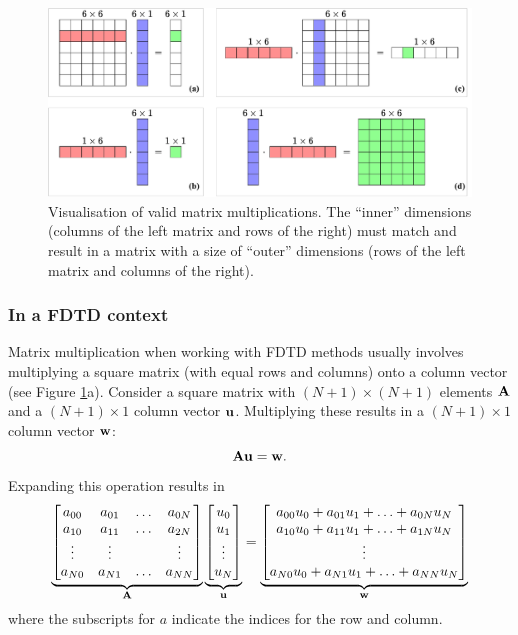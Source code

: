 \begin{figure}[h]
    \includegraphics[width=\textwidth]{figures/analysis/matrixVector.pdf}
    \caption{Visualisation of valid matrix multiplications. The ``inner'' dimensions (columns of the left matrix and rows of the right) must match and result in a matrix with a size of ``outer'' dimensions (rows of the left matrix and columns of the right). \label{fig:matrixVector}}
\end{figure}

\subsubsection{In a FDTD context}
Matrix multiplication when working with FDTD methods usually involves multiplying a square matrix (with equal rows and columns) onto a column vector (see Figure \ref{fig:matrixVector}a). Consider a square matrix with $(N+1)\times (N+1)$ elements $\mathbf{A}$ and a $(N+1) \times 1$ column vector $\mathbf{u}$. Multiplying these results in a $(N+1) \times 1$ column vector $\mathbf{w}$:
\begin{equation}
    \mathbf{A}\mathbf{u} = \mathbf{w}.
\end{equation}
Expanding this operation results in 
\begin{equation}
    \underbrace{\begin{bmatrix}
        a_{00} & a_{01} & \hdots & a_{0N}\\
        a_{10} & a_{11} & \hdots & a_{2N}\\
        \vdots & \vdots & &\vdots\\
        a_{N0} & a_{N1} & \hdots & a_{NN}
    \end{bmatrix}}_{\mathbf{A}}
    \underbrace{\begin{bmatrix}
        u_0\\
        u_1\\
        \vdots\\
        u_N
    \end{bmatrix}}_{\mathbf{u}} = 
    \underbrace{\begin{bmatrix}
        a_{00}u_0 + a_{01}u_1 + \hdots + a_{0N}u_N\\
        a_{10}u_0 + a_{11}u_1 + \hdots + a_{1N}u_N\\
        \vdots\\
        a_{N0}u_0 + a_{N1}u_1 + \hdots + a_{NN}u_N
    \end{bmatrix}}_{\mathbf{w}}
\end{equation}
where the subscripts for $a$ indicate the indices for the row and column.

